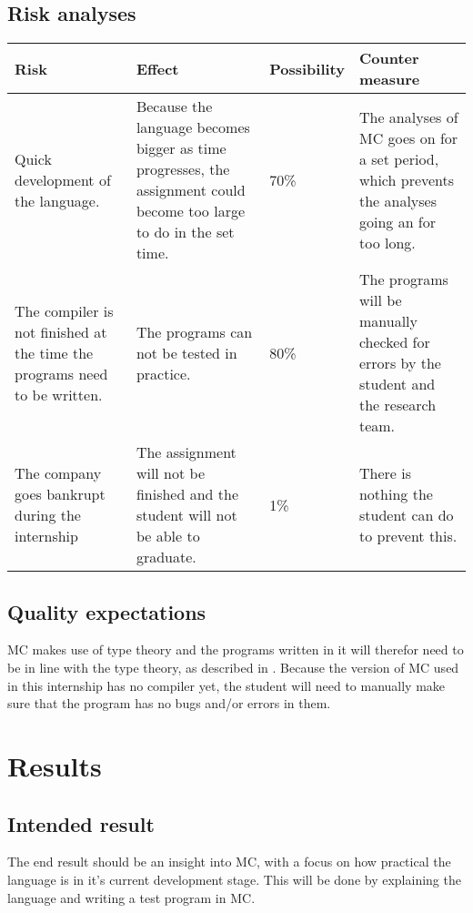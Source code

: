 \section{Risk analyses}
\begin{center}
   \begin{tabular}
      {| p{} | p{} | l | p{} |}
      \hline
      \textbf{Risk} & \textbf{Effect} & \textbf{Possibility} & \textbf{Counter measure}
      \\ \hline
      Quick development of the language. & Because the language becomes bigger as time progresses, the assignment could become too large to do in the set time. & 70\% & The analyses of MC goes on for a set period, which prevents the analyses going an for too long.
      \\ \hline
      The compiler is not finished at the time the programs need to be written. & The programs can not be tested in practice. & 80\% & The programs will be manually checked for errors by the student and the research team.
      \\ \hline
      The company goes bankrupt during the internship & The assignment will not be finished and the student will not be able to graduate. & 1\% & There is nothing the student can do to prevent this.
      \\ \hline
   \end{tabular}
\end{center}

\section{Quality expectations}
MC makes use of type theory and the programs written in it will therefor need to be in line with the type theory, as described in \cite{pierce2002types}.
Because the version of MC used in this internship has no compiler yet, the student will need to manually make sure that the program has no bugs and/or errors in them.

\chapter{Results}
\section{Intended result}
The end result should be an insight into MC, with a focus on how practical the language is in it's current development stage.
This will be done by explaining the language and writing a test program in MC.

